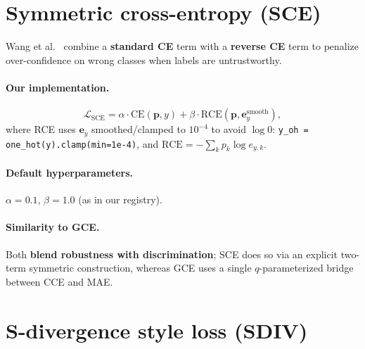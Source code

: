 \documentclass[11pt,a4paper]{article}
\begin{document}
\section{Symmetric cross-entropy (SCE)}

Wang et al.\ \cite{wang2019sce} combine a \textbf{standard CE} term with a \textbf{reverse CE} term to penalize over-confidence on wrong classes when labels are untrustworthy.

\paragraph{Our implementation.}
\begin{equation}
  \mathcal{L}_{\mathrm{SCE}} = \alpha \cdot \mathrm{CE}(\mathbf{p}, y) + \beta \cdot \mathrm{RCE}(\mathbf{p}, \mathbf{e}_y^{\mathrm{smooth}}),
\end{equation}
where RCE uses $\mathbf{e}_y$ smoothed/clamped to $10^{-4}$ to avoid $\log 0$:
\texttt{y\_oh = one\_hot(y).clamp(min=1e-4)}, and $\mathrm{RCE} = - \sum_k p_k \log e_{y,k}$.

\paragraph{Default hyperparameters.} $\alpha=0.1$, $\beta=1.0$ (as in our registry).

\paragraph{Similarity to GCE.}
Both \textbf{blend robustness with discrimination}; SCE does so via an explicit two-term symmetric construction, whereas GCE uses a single $q$-parameterized bridge between CCE and MAE.

\section{S-divergence style loss (SDIV)}
\end{document}
